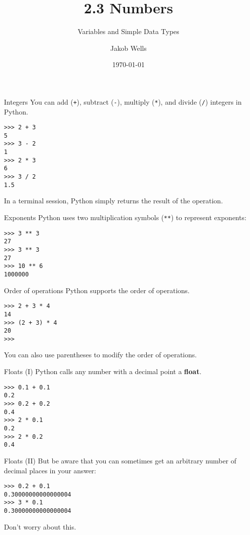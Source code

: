 \documentclass[aspectratio=169]{beamer}
\title{2.3 Numbers}
\subtitle{Variables and Simple Data Types}
\author{Jakob Wells}
\begin{document}
\date{\today}


\begin{frame}
    \titlepage{}
\end{frame}


\begin{frame}[fragile]{Integers}
    You can add (\texttt{+}), subtract (\texttt{-}), multiply (\texttt{*}), and divide (\texttt{/}) integers in Python.
    \vspace{10pt}
    \begin{verbatim}
>>> 2 + 3
5
>>> 3 - 2
1
>>> 2 * 3
6
>>> 3 / 2
1.5
    \end{verbatim}
    \vspace{25pt}
    In a terminal session, Python simply returns the result of the operation.
\end{frame}


\begin{frame}[fragile]{Exponents}
    Python uses two multiplication symbols (\texttt{**}) to represent exponents:
    \vspace{10pt}
    \begin{verbatim}
>>> 3 ** 3
27
>>> 3 ** 3
27
>>> 10 ** 6
1000000
    \end{verbatim}
\end{frame}


\begin{frame}[fragile]{Order of operations}
    Python supports the order of operations.
    \vspace{10pt}
    \begin{verbatim}
>>> 2 + 3 * 4
14
>>> (2 + 3) * 4
20
>>>
    \end{verbatim}
    \vspace{25pt}
    You can also use parentheses to modify the order of operations.
\end{frame}


\begin{frame}[fragile]{Floats (I)}
    Python calls any number with a decimal point a \textbf{float}.
    \vspace{10pt}
    \begin{verbatim}
>>> 0.1 + 0.1
0.2
>>> 0.2 + 0.2
0.4
>>> 2 * 0.1
0.2
>>> 2 * 0.2
0.4
    \end{verbatim}
\end{frame}


\begin{frame}[fragile]{Floats (II)}
    But be aware that you can sometimes get an arbitrary number of decimal places in your answer:
    \vspace{10pt}
    \begin{verbatim}
>>> 0.2 + 0.1
0.30000000000000004
>>> 3 * 0.1
0.30000000000000004
    \end{verbatim}
    \vspace{25pt}
    Don't worry about this.
\end{frame}
\end{document}
